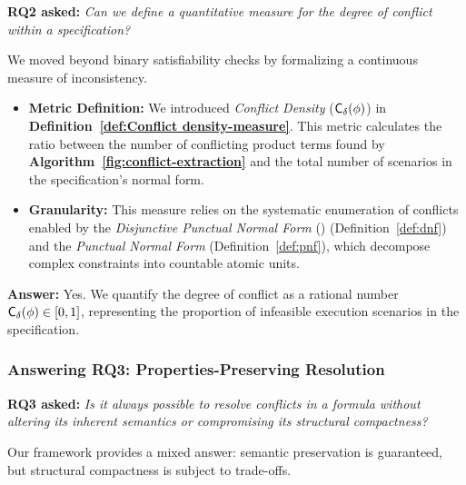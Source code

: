 \textbf{RQ2 asked:} \emph{Can we define a quantitative measure for the degree of conflict within a specification?}

We moved beyond binary satisfiability checks by formalizing a continuous measure of inconsistency.

\begin{itemize}
    \item \textbf{Metric Definition:} We introduced \emph{Conflict Density} ($\mathsf{C_\delta} (\phi)$) in \textbf{Definition~\ref{def:Conflict density-measure}}. This metric calculates the ratio between the number of conflicting product terms found by \textbf{Algorithm~\ref{fig:conflict-extraction}} and the total number of scenarios in the specification's normal form.
    
    \item \textbf{Granularity:} This measure relies on the systematic enumeration of conflicts enabled by the \emph{Disjunctive Punctual Normal Form} (\dpnf) (Definition~\ref{def:dnf}) and the \emph{Punctual Normal Form} (Definition~\ref{def:pnf}), which decompose complex constraints into countable atomic units.
\end{itemize}

\noindent \textbf{Answer:} Yes. We quantify the degree of conflict as a rational number $\mathsf{C_\delta} (\phi) \in [0,1]$, representing the proportion of infeasible execution scenarios in the specification.

\subsubsection{Answering RQ3: Properties-Preserving Resolution}

\textbf{RQ3 asked:} \emph{Is it always possible to resolve conflicts in a formula without altering its inherent semantics or compromising its structural compactness?}

Our framework provides a mixed answer: semantic preservation is guaranteed, but structural compactness is subject to trade-offs.

